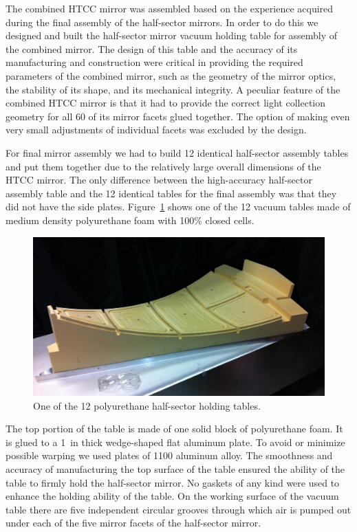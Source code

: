 The combined HTCC mirror was assembled based on the experience acquired during the final assembly of the
half-sector mirrors. In order to do this we designed and built the half-sector mirror vacuum holding table for
assembly of the combined mirror. The design of this table and the accuracy of its manufacturing and construction
were critical in providing the required parameters of the combined mirror, such as the geometry of the mirror
optics, the stability of its shape, and its mechanical integrity. A peculiar feature of the combined HTCC mirror is
that it had to provide the correct light collection geometry for all 60 of its mirror facets glued together. The
option of making even very small adjustments of individual facets was excluded by the design.
 
For final mirror assembly we had to build 12 identical half-sector assembly tables and put them together due to the
relatively large overall dimensions of the HTCC mirror. The only difference between the high-accuracy half-sector
assembly table and the 12 identical tables for the final assembly was that they did not have the side plates.
Figure~\ref{fig:One_Foam_Vacuum_Table} shows one of the 12 vacuum tables made of medium density
polyurethane foam with 100\% closed cells.
 
\begin{figure}[ht]
    \centering
    \includegraphics[width=1.0\linewidth]{images/One_Foam_Vacuum_Table.jpg}
    \caption{One of the 12 polyurethane half-sector holding tables.}
    \label{fig:One_Foam_Vacuum_Table}
\end{figure}
 
The top portion of the table is made of one solid block of polyurethane foam. It is glued to a 1~in thick wedge-shaped
flat aluminum plate. To avoid or minimize possible warping we used plates of 1100 aluminum alloy. The smoothness and
accuracy of manufacturing the top surface of the table ensured the ability of the table to firmly hold the half-sector
mirror. No gaskets of any kind were used to enhance the holding ability of the table. On the working surface of the
vacuum table there are five independent circular grooves through which air is pumped out under each of the five
mirror facets of the half-sector mirror. 

